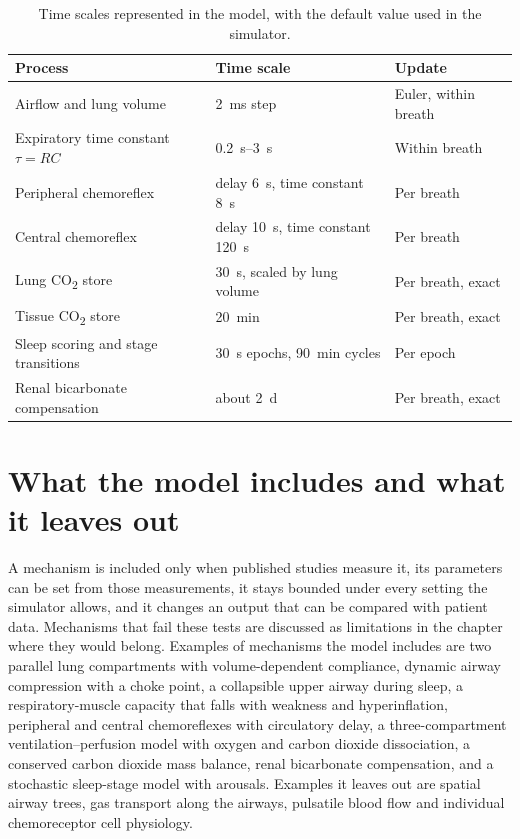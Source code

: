 \begin{table}[ht]
\centering
\caption{Time scales represented in the model, with the default value used in the simulator.}
\label{tab:overview-timescales}
\small
\begin{tabularx}{\linewidth}{@{}X l l@{}}
\toprule
Process & Time scale & Update \\
\midrule
Airflow and lung volume & \SI{2}{\milli\second} step & Euler, within breath \\
Expiratory time constant $\tau = RC$ & \SIrange{0.2}{3}{\second} & Within breath \\
Peripheral chemoreflex & delay \SI{6}{\second}, time constant \SI{8}{\second} & Per breath \\
Central chemoreflex & delay \SI{10}{\second}, time constant \SI{120}{\second} & Per breath \\
Lung CO\textsubscript{2} store & \SI{30}{\second}, scaled by lung volume & Per breath, exact \\
Tissue CO\textsubscript{2} store & \SI{20}{\minute} & Per breath, exact \\
Sleep scoring and stage transitions & \SI{30}{\second} epochs, \SI{90}{\minute} cycles & Per epoch \\
Renal bicarbonate compensation & about \SI{2}{\day} & Per breath, exact \\
\bottomrule
\end{tabularx}
\end{table}

\section{What the model includes and what it leaves out}
\label{sec:overview-scope}
A mechanism is included only when published studies measure it, its parameters can be set from those measurements, it stays bounded under every setting the simulator allows, and it changes an output that can be compared with patient data. Mechanisms that fail these tests are discussed as limitations in the chapter where they would belong. Examples of mechanisms the model includes are two parallel lung compartments with volume-dependent compliance, dynamic airway compression with a choke point, a collapsible upper airway during sleep, a respiratory-muscle capacity that falls with weakness and hyperinflation, peripheral and central chemoreflexes with circulatory delay, a three-compartment ventilation--perfusion model with oxygen and carbon dioxide dissociation, a conserved carbon dioxide mass balance, renal bicarbonate compensation, and a stochastic sleep-stage model with arousals. Examples it leaves out are spatial airway trees, gas transport along the airways, pulsatile blood flow and individual chemoreceptor cell physiology.

